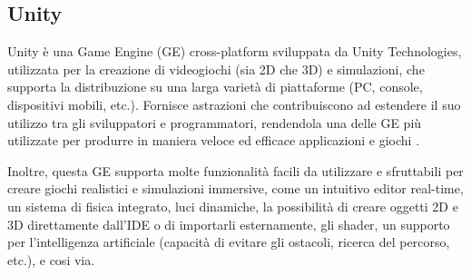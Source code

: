 \subsection{Unity} \label{unity}

Unity è una Game Engine (GE) cross-platform sviluppata da Unity Technologies, utilizzata per la creazione di videogiochi (sia 2D che 3D) e simulazioni, che supporta la distribuzione su una larga varietà di piattaforme (PC, console, dispositivi mobili, etc.). Fornisce astrazioni che contribuiscono ad estendere il suo utilizzo tra gli sviluppatori e programmatori, rendendola una delle GE più utilizzate per produrre in maniera veloce ed efficace applicazioni e giochi \cite{unity}.

\medskip

Inoltre, questa GE supporta molte funzionalità facili da utilizzare e sfruttabili per creare giochi realistici e simulazioni immersive, come un intuitivo editor real-time, un sistema di fisica integrato, luci dinamiche, la possibilità di creare oggetti 2D e 3D direttamente dall'IDE o di importarli esternamente, gli shader, un supporto per l'intelligenza artificiale (capacità di evitare gli ostacoli, ricerca del percorso, etc.), e cosi via.

\medskip

